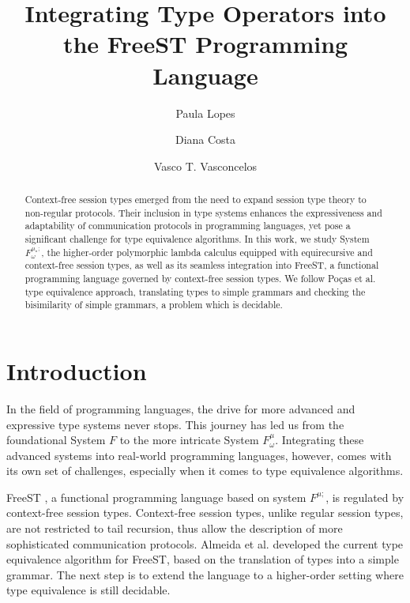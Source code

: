 \documentclass[runningheads,dvipsnames]{llncs}
\begin{document}
%
\title{Integrating Type Operators into the FreeST Programming Language}
%
%
\author{Paula Lopes \and
Diana Costa \and
Vasco T. Vasconcelos}

%
%
%
\maketitle              %
%
\begin{abstract}
Context-free session types emerged from the need to expand session type theory to non-regular protocols. Their inclusion in type systems enhances the expressiveness and adaptability of communication protocols in programming languages, yet pose a significant challenge for type equivalence algorithms. In this work, we study System $F^{\mu_*;}_\omega$, the higher-order polymorphic lambda calculus equipped with equirecursive and context-free session types, as well as its seamless integration into FreeST, a functional programming language governed by context-free session types.
We follow Po\c{c}as et al. \cite{PocasCMV23} type equivalence approach, translating types to simple grammars and checking the bisimilarity of simple grammars, a problem which is decidable.


\end{abstract}

\section{Introduction}
In the field of programming languages, the drive for more advanced and expressive type systems never stops. This journey has led us from the foundational System $F$\cite{DBLP:conf/programm/Reynolds74} to the more intricate System $F^{\mu}_\omega$\cite{DBLP:conf/popl/CaiGO16}. Integrating these advanced systems into real-world programming languages, however, comes with its own set of challenges, especially when it comes to type equivalence algorithms.

FreeST \cite{AlmeidaMTV22}, a functional programming language based on system $F^{\mu;}$, is regulated by context-free session types. Context-free session types, unlike regular session types, are not restricted to tail recursion, thus allow the description of more sophisticated communication protocols. Almeida et al. \cite{AlmeidaMV20} developed the current type equivalence algorithm for FreeST, based on the translation of types into a simple grammar. The next step is to extend the language to a higher-order setting where type equivalence is still decidable.
\end{document}

